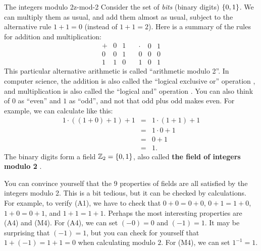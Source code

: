 \begin{example}{The integers modulo 2}{z-mod-2}
  Consider the set of {\em bits}%
   (binary digits) $\left\{0,1\right\}$.  We can multiply them as
  usual, and add them almost as usual, subject to the alternative rule
  $1+1=0$ (instead of $1+1=2$). Here is a summary of the rules for
  addition and multiplication:
  \begin{equation*}
    \begin{array}{l|ll}
      + & 0 & 1 \\\hline
      0 & 0 & 1 \\
      1 & 1 & 0
    \end{array}
    \quad
    \begin{array}{l|ll}
      \cdot & 0 & 1 \\\hline
      0 & 0 & 0 \\
      1 & 0 & 1
    \end{array}
  \end{equation*}
  This particular alternative arithmetic is called ``arithmetic modulo
  2''.  In computer science, the addition is also called the ``logical
  exclusive or'' operation%
  , and multiplication is also
  called the ``logical and'' operation%
  . You can also think of $0$ as ``even''
  and $1$ as ``odd'', and not that odd plus odd makes even. For
  example, we can calculate like this:
  \begin{equation*}
    \begin{array}{lll}
      1\cdot((1+0)+1) + 1 &=& 1\cdot(1+1) + 1 \\
                          &=& 1\cdot 0 + 1 \\
                          &=& 0 + 1 \\
                          &=& 1.
    \end{array}
  \end{equation*}
  The binary digits form a field $\mathbb{Z}_2 = \left\{0,1\right\}$, also
  called \textbf{the field of integers modulo 2}%
  .
\end{example}

You can convince yourself that the 9 properties of fields are all
satisfied by the integers modulo 2. This is a bit tedious, but it can
be checked by calculations.  For example, to verify (A1), we have to
check that $0+0=0+0$, $0+1=1+0$, $1+0=0+1$, and $1+1=1+1$. Perhaps the
most interesting properties are (A4) and (M4). For (A4), we can set
$(-0)=0$ and $(-1)=1$. It may be surprising that $(-1)=1$, but you can
check for yourself that $1+(-1)=1+1=0$ when calculating modulo
$2$. For (M4), we can set $1^{-1} = 1$.

